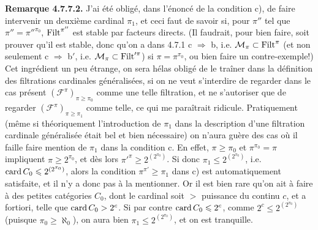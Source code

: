 \noindent{}\textbf{Remarque 4.7.7.2.} J'ai été obligé, dans l'énoncé de la condition c), de faire intervenir un deuxième cardinal $\pi_1$, et ceci faut de savoir si, pour $\pi''$ tel que $\pi''=\pi''^{\pi_0}$, $\operatorname{Filt}^{\pi''}$ est stable par facteurs directs. (Il faudrait, pour bien faire, soit prouver qu'il est stable, donc qu'on a dans 4.7.1 c $\Longrightarrow$ b, i.e. $\mathcal{M}_\pi\subset\operatorname{Filt}^{\pi}$ (et non seulement c $\Longrightarrow$ b$'$, i.e. $\mathcal{M}_\pi\subset\operatorname{Filt}'^{\pi}$) si $\pi=\pi^{\pi_0}$, ou bien faire un contre-exemple!) Cet ingrédient un peu étrange, on sera hélas obligé de le traîner dans la définition des filtrations cardinales généralisées, si on ne veut s'interdire de regarder dans le cas présent $(\mathcal{F}^{\pi})_{\pi\geqslant\pi_0}$ comme une telle filtration, et ne s'autoriser que de regarder $(\mathcal{F}^{\pi})_{\pi\geqslant\pi_1}$ comme telle, ce qui me paraîtrait ridicule. Pratiquement (même si théoriquement l'introduction de $\pi_1$ dans la description d'une filtration cardinale généralisée était bel et bien nécessaire) on n'aura guère des cas où il faille faire mention de $\pi_1$ dans la condition c. En effet, $\pi\geqslant\pi_0$ et $\pi^{\pi_0}=\pi$ impliquent $\pi\geqslant 2^{\pi_0}$, et dès lors $\pi'^{\pi}\geqslant 2^{(2^{\pi_0})}$. Si donc $\pi_1\leqslant 2^{(2^{\pi_0})}$, i.e. $\operatorname{card} C_0\leqslant 2^{(2^{\pi_0})}$, alors la condition $\pi^{\pi'}\geqslant\pi_1$ dans c) est automatiquement satisfaite, et il n'y a donc pas à la mentionner. Or il est bien rare qu'on ait à faire à des petites catégories $C_0$, dont le cardinal soit $>$ puissance %
du continu $c$, et a fortiori, telle que $\operatorname{card} C_0 > 2^{c}$. Si par contre $\operatorname{card} C_0\leqslant 2^{c}$, comme $2^{c}\leqslant 2^{(2^{\pi_0})}$ (puisque $\pi_0\geqslant\aleph_0$), on aura bien $\pi_1\leqslant 2^{(2^{\pi_0})}$, et on est tranquille.

